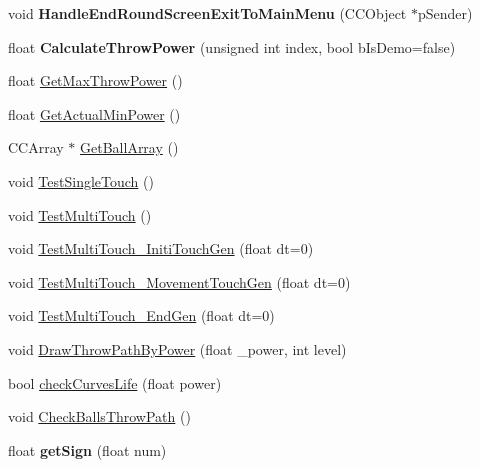 \begin{DoxyCompactItemize}
\item 
\hypertarget{class_j_g___game___main_a2e3c9eb3caf2b4dd7d66e7b943a665e1}{void {\bfseries Handle\-End\-Round\-Screen\-Exit\-To\-Main\-Menu} (C\-C\-Object $\ast$p\-Sender)}\label{class_j_g___game___main_a2e3c9eb3caf2b4dd7d66e7b943a665e1}

\item 
\hypertarget{class_j_g___game___main_a12416f1f1f78abed18cf82cdeecb8126}{float {\bfseries Calculate\-Throw\-Power} (unsigned int index, bool b\-Is\-Demo=false)}\label{class_j_g___game___main_a12416f1f1f78abed18cf82cdeecb8126}

\item 
float \hyperlink{class_j_g___game___main_acb38337ccbd703df64be869986eaab62}{Get\-Max\-Throw\-Power} ()
\item 
float \hyperlink{class_j_g___game___main_a50c9a071fc59edf3e05868edf795726d}{Get\-Actual\-Min\-Power} ()
\item 
C\-C\-Array $\ast$ \hyperlink{class_j_g___game___main_a254fa6dd51aa695ae23d4f54b446b1b1}{Get\-Ball\-Array} ()
\item 
void \hyperlink{class_j_g___game___main_ad4691efc615e12254ea347a7b21cd167}{Test\-Single\-Touch} ()
\item 
void \hyperlink{class_j_g___game___main_a5ad7dc858f795f34d33c13b712880b43}{Test\-Multi\-Touch} ()
\item 
void \hyperlink{class_j_g___game___main_a104c8ad94eb551ad2ba292aa46c0298c}{Test\-Multi\-Touch\-\_\-\-Initi\-Touch\-Gen} (float dt=0)
\item 
void \hyperlink{class_j_g___game___main_ae410c7d1cc74a9e7bf6bc51b525f889e}{Test\-Multi\-Touch\-\_\-\-Movement\-Touch\-Gen} (float dt=0)
\item 
void \hyperlink{class_j_g___game___main_ab2d7fb8240de8466d624a2f187d5eadf}{Test\-Multi\-Touch\-\_\-\-End\-Gen} (float dt=0)
\item 
void \hyperlink{class_j_g___game___main_ab9f2f9db5c2a165d1830f9c7f4d5dcb4}{Draw\-Throw\-Path\-By\-Power} (float \-\_\-power, int level)
\item 
bool \hyperlink{class_j_g___game___main_a2123df0b4798405fe04b44f570f90a41}{check\-Curves\-Life} (float power)
\item 
void \hyperlink{class_j_g___game___main_a6ecf499fd1416de502ea62cf09b06d48}{Check\-Balls\-Throw\-Path} ()
\item 
\hypertarget{class_j_g___game___main_aa386bd7cdada1f23b0b32526e67cc2b0}{float {\bfseries get\-Sign} (float num)}\label{class_j_g___game___main_aa386bd7cdada1f23b0b32526e67cc2b0}


\end{DoxyCompactItemize}
